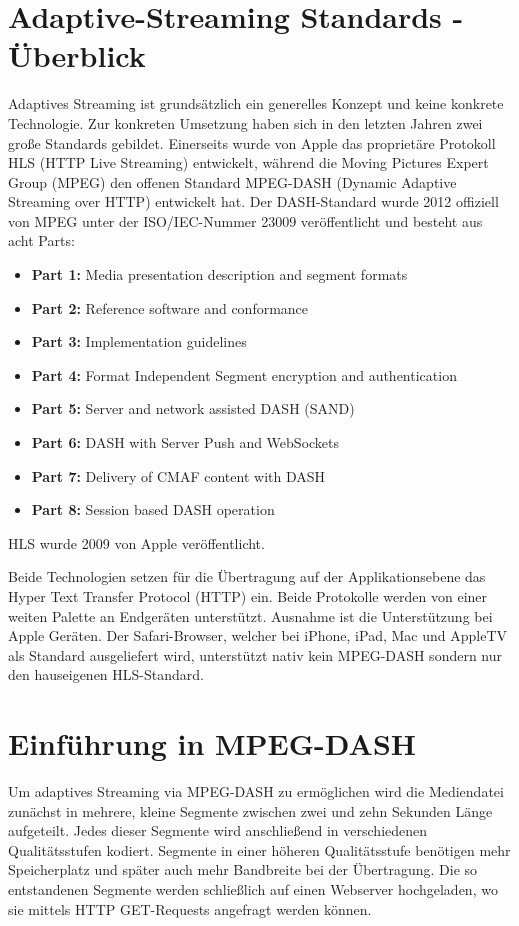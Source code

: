 \documentclass[paper = a4, fontsize = 12pt, parskip = half]{scrartcl} %
\begin{document}
\section{Adaptive-Streaming Standards - Überblick}
Adaptives Streaming ist grundsätzlich ein generelles Konzept und keine konkrete Technologie. Zur konkreten Umsetzung haben sich in den letzten Jahren zwei große Standards gebildet. Einerseits wurde von Apple das proprietäre Protokoll HLS (HTTP Live Streaming) entwickelt, während die Moving Pictures Expert Group (MPEG) den offenen Standard MPEG-DASH (Dynamic Adaptive Streaming over HTTP) entwickelt hat. Der DASH-Standard wurde 2012 offiziell von MPEG unter der ISO/IEC-Nummer 23009 veröffentlicht und besteht aus acht Parts:

\begin{itemize}
	\item \textbf{Part 1:} Media presentation description and segment formats
	\item \textbf{Part 2:} Reference software and conformance
	\item \textbf{Part 3:} Implementation guidelines
	\item \textbf{Part 4:} Format Independent Segment encryption and authentication
	\item \textbf{Part 5:} Server and network assisted DASH (SAND)
	\item \textbf{Part 6:} DASH with Server Push and WebSockets
	\item \textbf{Part 7:} Delivery of CMAF content with DASH
	\item \textbf{Part 8:} Session based DASH operation
\end{itemize}

HLS wurde 2009 von Apple veröffentlicht.

Beide Technologien setzen für die Übertragung auf der Applikationsebene das Hyper Text Transfer Protocol (HTTP) ein. Beide Protokolle werden von einer weiten Palette an Endgeräten unterstützt. Ausnahme ist die Unterstützung bei Apple Geräten. Der Safari-Browser, welcher bei iPhone, iPad, Mac und AppleTV als Standard ausgeliefert wird, unterstützt nativ kein MPEG-DASH sondern nur den hauseigenen HLS-Standard.

\section{Einführung in MPEG-DASH}
Um adaptives Streaming via MPEG-DASH zu ermöglichen wird die Mediendatei zunächst in mehrere, kleine Segmente zwischen zwei und zehn Sekunden Länge aufgeteilt. Jedes dieser Segmente wird anschließend in verschiedenen Qualitätsstufen kodiert. Segmente in einer höheren Qualitätsstufe benötigen mehr Speicherplatz und später auch mehr Bandbreite bei der Übertragung. Die so entstandenen Segmente werden schließlich auf einen Webserver hochgeladen, wo sie mittels HTTP GET-Requests angefragt werden können.
\end{document}
